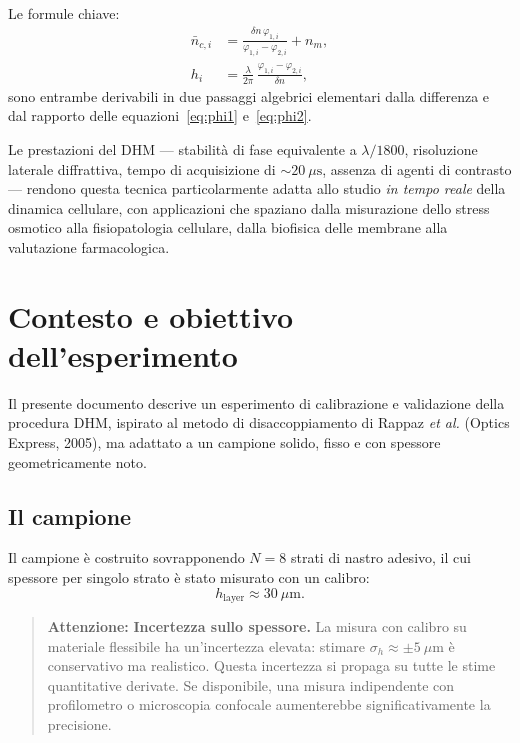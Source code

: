 Le formule chiave:
\begin{align*}
  \bar{n}_{c,i} &= \frac{\delta n\,\varphi_{1,i}}{\varphi_{1,i}-\varphi_{2,i}} + n_m,
  \tag{4} \\[6pt]
  h_i &= \frac{\lambda}{2\pi}\,\frac{\varphi_{1,i}-\varphi_{2,i}}{\delta n},
  \tag{5}
\end{align*}
sono entrambe derivabili in due passaggi algebrici elementari dalla differenza e
dal rapporto delle equazioni~\eqref{eq:phi1} e~\eqref{eq:phi2}.

Le prestazioni del DHM — stabilità di fase equivalente a $\lambda/1800$, risoluzione
laterale diffrattiva, tempo di acquisizione di $\sim 20\ \mu\mathrm{s}$, assenza di
agenti di contrasto — rendono questa tecnica particolarmente adatta allo studio
\emph{in tempo reale} della dinamica cellulare, con applicazioni che spaziano dalla
misurazione dello stress osmotico alla fisiopatologia cellulare, dalla biofisica delle
membrane alla valutazione farmacologica.


\section{Contesto e obiettivo dell'esperimento}

Il presente documento descrive un esperimento di calibrazione e validazione della
procedura DHM, ispirato al metodo di disaccoppiamento di Rappaz \textit{et al.}
(Optics Express, 2005), ma adattato a un campione solido, fisso e con spessore
geometricamente noto.

\subsection{Il campione}

Il campione è costruito sovrapponendo $N = 8$ strati di nastro adesivo, il cui
spessore per singolo strato è stato misurato con un calibro:
\[
  h_\text{layer} \approx 30\ \mu\text{m}.
\]

\begin{quote}
\textcolor{red!70!black}{\textbf{Attenzione:}} \textbf{Incertezza sullo spessore.} La misura con calibro su materiale
flessibile ha un'incertezza elevata: stimare $\sigma_{h} \approx \pm 5\ \mu\text{m}$
è conservativo ma realistico. Questa incertezza si propaga su tutte le stime
quantitative derivate. Se disponibile, una misura indipendente con profilometro
o microscopia confocale aumenterebbe significativamente la precisione.
\end{quote}

